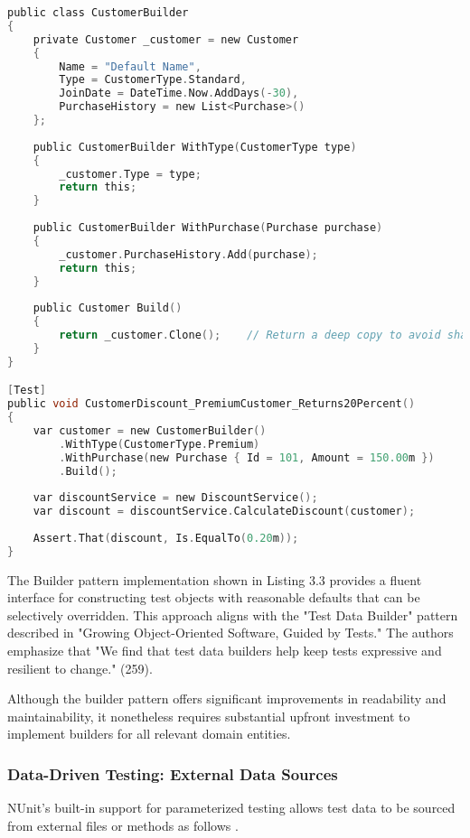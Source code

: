 \begin{lstlisting}[language=C, caption=Test Data Builders]
public class CustomerBuilder
{
    private Customer _customer = new Customer
    {
        Name = "Default Name",
        Type = CustomerType.Standard,
        JoinDate = DateTime.Now.AddDays(-30),
        PurchaseHistory = new List<Purchase>()
    };
    
    public CustomerBuilder WithType(CustomerType type)
    {
        _customer.Type = type;
        return this;
    }
    
    public CustomerBuilder WithPurchase(Purchase purchase)
    {
        _customer.PurchaseHistory.Add(purchase);
        return this;
    }
    
    public Customer Build()
    {
        return _customer.Clone();    // Return a deep copy to avoid shared references
    }
}

[Test]
public void CustomerDiscount_PremiumCustomer_Returns20Percent()
{
    var customer = new CustomerBuilder()
        .WithType(CustomerType.Premium)
        .WithPurchase(new Purchase { Id = 101, Amount = 150.00m })
        .Build();
        
    var discountService = new DiscountService();
    var discount = discountService.CalculateDiscount(customer);
    
    Assert.That(discount, Is.EqualTo(0.20m));
}
\end{lstlisting}

The Builder pattern implementation shown in Listing 3.3 provides a fluent interface for constructing test objects with reasonable defaults that can be selectively overridden. This approach aligns with the "Test Data Builder" \cite{freeman2009growing} pattern described in "Growing Object-Oriented Software, Guided by Tests."\cite{freeman2009growing} The authors emphasize that "We find that test data builders help keep tests expressive and resilient to change." (259).

Although the builder pattern offers significant improvements in readability and maintainability, it nonetheless requires substantial upfront investment to implement builders for all relevant domain entities.

\subsubsection{Data-Driven Testing: External Data Sources}

NUnit's built-in support for parameterized testing allows test data to be sourced from external files or methods as follows .

